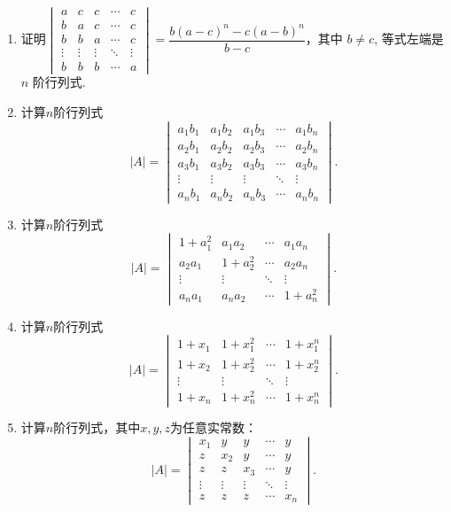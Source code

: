\begin{enumerate}
    \item 证明$\begin{vmatrix}
        a      & c      & c      & \cdots & c      \\
        b      & a      & c      & \cdots & c      \\
        b      & b      & a      & \cdots & c      \\
        \vdots & \vdots & \vdots & \ddots & \vdots \\
        b      & b      & b      & \cdots & a
    \end{vmatrix}=\dfrac{b(a-c)^{n}-c(a-b)^{n}}{b-c}$，其中 $b \neq c$, 等式左端是 $n$ 阶行列式.

    \item 计算$n$阶行列式
    \[|A|=\begin{vmatrix}
        a_1b_1 & a_1b_2 & a_1b_3 & \cdots & a_1b_n \\
        a_2b_1 & a_2b_2 & a_2b_3 & \cdots & a_2b_n \\
        a_3b_1 & a_3b_2 & a_3b_3 & \cdots & a_3b_n \\
        \vdots & \vdots & \vdots & \ddots & \vdots \\
        a_nb_1 & a_nb_2 & a_nb_3 & \cdots & a_nb_n
    \end{vmatrix}.\]

    \item 计算$n$阶行列式
    \[|A|=\begin{vmatrix}
        1+a_1^2 & a_1a_2 & \cdots & a_1a_n \\
        a_2a_1 & 1+a_2^2 & \cdots & a_2a_n \\
        \vdots & \vdots & \ddots & \vdots \\
        a_na_1 & a_na_2 & \cdots & 1+a_n^2
    \end{vmatrix}.\]

    \item 计算$n$阶行列式
    \[|A|=\begin{vmatrix}
        1+x_1 & 1+x_1^2 & \cdots & 1+x_1^n \\
        1+x_2 & 1+x_2^2 & \cdots & 1+x_2^n \\
        \vdots & \vdots & \ddots & \vdots \\
        1+x_n & 1+x_n^2 & \cdots & 1+x_n^n
    \end{vmatrix}.\]

    \item 计算$n$阶行列式，其中$x,y,z$为任意实常数：
    \[|A|=\begin{vmatrix}
        x_1 & y & y & \cdots & y \\
        z & x_2 & y & \cdots & y \\
        z & z & x_3 & \cdots & y \\
        \vdots & \vdots & \vdots & \ddots & \vdots \\
        z & z & z & \cdots & x_n
    \end{vmatrix}.\]
\end{enumerate}
